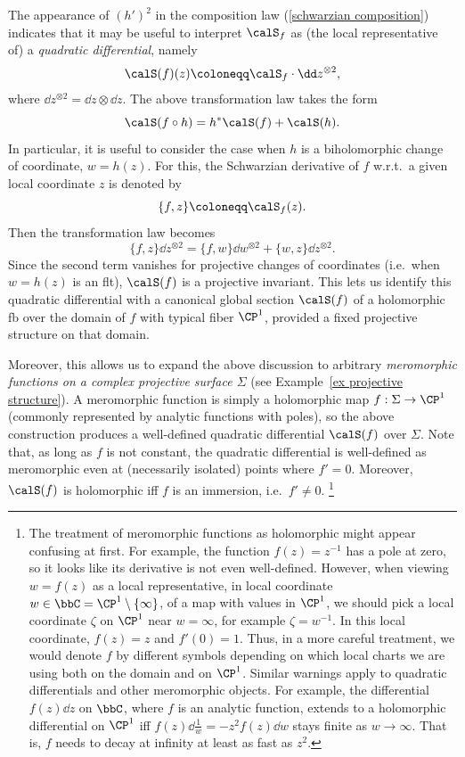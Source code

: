 \begin{rem}
    The appearance of $(h')^2$ in the composition law (\ref{schwarzian composition}) indicates that it may be useful to interpret $\calS_f$ as (the local representative of) a \emph{quadratic differential}, namely 
    \[\calS(f)(z)\coloneqq \calS_f\cdot \dd z^{\otimes 2},\] 
    where $\dd z^{\otimes 2}=\dd z\otimes \dd z$. The above transformation law takes the form 
    \[\calS(f\circ h)=h^\ast \calS(f)+\calS(h).\]
    In particular, it is useful to consider the case when $h$ is a biholomorphic change of coordinate, $w=h(z)$. For this, the Schwarzian derivative of $f$ w.r.t.\ a given local coordinate $z$ is denoted by 
    \[\{f,z\}\coloneqq \calS_f(z).\]
    Then the transformation law becomes 
    \[\{f,z\}\dd z^{\otimes 2}=\{f,w\}\dd w^{\otimes 2}+\{w,z\}\dd z^{\otimes 2}.\]
    Since the second term vanishes for projective changes of coordinates (i.e.\ when $w=h(z)$ is an \gls{flt}), $\calS(f)$ is a projective invariant. This lets us identify this quadratic differential with a canonical global section $\calS(f)$ of a holomorphic \gls{fb} over the domain of $f$ with typical fiber $\CP^1$, provided a fixed projective structure on that domain. 
    
    Moreover, this allows us to expand the above discussion to arbitrary \emph{meromorphic functions on a complex projective surface $\Sigma$} (see Example~\ref{ex projective structure}). A meromorphic function is simply a holomorphic map $f:\Sigma\to \CP^1$ (commonly represented by analytic functions with poles), so the above construction produces a well-defined quadratic differential $\calS(f)$ over $\Sigma$. Note that, as long as $f$ is not constant, the quadratic differential is well-defined as meromorphic even at (necessarily isolated) points where $f'=0$. Moreover, $\calS(f)$ is holomorphic iff $f$ is an immersion, i.e.\ $f'\neq 0$.
    \footnote{The treatment of meromorphic functions as holomorphic might appear confusing at first. For example, the function $f(z)=z^{-1}$ has a pole at zero, so it looks like its derivative is not even well-defined. However, when viewing $w=f(z)$ as a local representative, in local coordinate $w\in\bbC=\CP^1\setminus\{\infty\}$, of a map with values in $\CP^1$, we should pick a local coordinate $\zeta$ on $\CP^1$ near $w=\infty$, for example $\zeta=w^{-1}$. In this local coordinate, $f(z)=z$ and $f'(0)=1$. Thus, in a more careful treatment, we would denote $f$ by different symbols depending on which local charts we are using both on the domain and on $\CP^1$. Similar warnings apply to quadratic differentials and other meromorphic objects. For example, the differential $f(z)\dd z$ on $\bbC$, where $f$ is an analytic function, extends to a holomorphic differential on $\CP^1$ iff $f(z)\dd \frac{1}{w}=-z^2 f(z)\dd w$ stays finite as $w\to \infty$. That is, $f$ needs to decay at infinity at least as fast as $z^2$. }
    

\end{rem}
